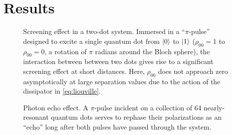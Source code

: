 \documentclass[conference]{IEEEtran}
\begin{document}
\section{Results}

\begin{figure}
  \centering
  
  \caption{\label{fig:screening} Screening effect in a two-dot system.
  Immersed in a ``$\pi$-pulse'' designed to excite a single quantum dot from $\ket{0}$ to $\ket{1}$ ($\rho_{00} = 1$ to $\rho_{00} = 0$, a rotation of $\pi$ radians around the Bloch sphere), the interaction between between two dots gives rise to a significant screening effect at short distances.
  Here, $\rho_{00}$ does not approach zero asymptotically at large separation values due to the action of the dissipator in \cref{eq:liouville}.
  }
\end{figure}

\begin{figure}
  \centering
  
  \caption{\label{fig:echo} Photon echo effect.
    A $\pi$-pulse incident on a collection of 64 nearly-resonant quantum dots serves to rephase their polarizations as an ``echo'' long after both pulses have passed through the system.
  }
\end{figure}


{}

\end{document}

